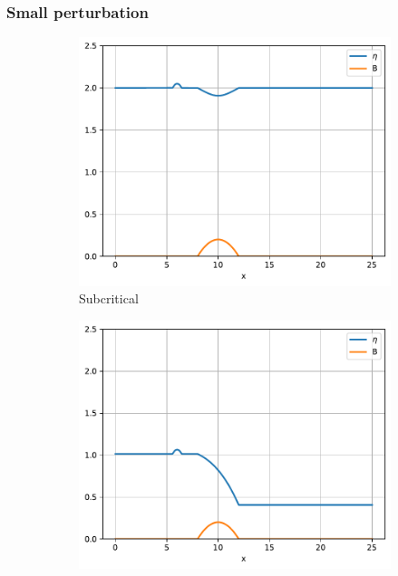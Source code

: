 \documentclass[pt12]{beamer}
\begin{document}
\begin{frame}
\frametitle{Small perturbation}
\centering

\begin{figure}
     \centering
     \begin{subfigure}[b]{0.30\textwidth}
         \centering
         \includegraphics[width=\textwidth]{sub_not_smooth.pdf}
         \caption{Subcritical}
     \end{subfigure}
     \begin{subfigure}[b]{0.30\textwidth}
         \centering
         \includegraphics[width=\textwidth]{trans_not_smooth.pdf}

\end{subfigure}
\end{figure}
\end{frame}
\end{document}

